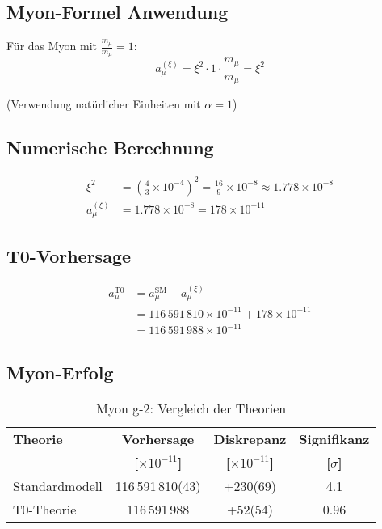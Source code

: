 \documentclass[12pt,a4paper]{article}
\newcommand{\xipar}{\xi}
\begin{document}
	\subsection{Myon-Formel Anwendung}
	
	Für das Myon mit \(\frac{m_\mu}{m_\mu} = 1\):
	\begin{equation}
		a_\mu^{(\xipar)} = \xipar^2 \cdot 1 \cdot \frac{m_\mu}{m_\mu} = \xipar^2
	\end{equation}
	
	(Verwendung natürlicher Einheiten mit \(\alpha = 1\))
	
	\subsection{Numerische Berechnung}
	
	\begin{align}
		\xipar^2 &= \left(\frac{4}{3} \times 10^{-4}\right)^2 = \frac{16}{9} \times 10^{-8} \approx 1.778 \times 10^{-8} \\
		a_\mu^{(\xipar)} &= 1.778 \times 10^{-8} = 178 \times 10^{-11}
	\end{align}
	
	\subsection{T0-Vorhersage}
	
	\begin{align}
		a_\mu^{\text{T0}} &= a_\mu^{\text{SM}} + a_\mu^{(\xipar)} \\
		&= 116\,591\,810 \times 10^{-11} + 178 \times 10^{-11} \\
		&= 116\,591\,988 \times 10^{-11}
	\end{align}
	
	\subsection{Myon-Erfolg}
	
	\begin{table}[H]
		\centering
		\caption{Myon g-2: Vergleich der Theorien}
		\begin{tabular}{@{}lccc@{}}
			\toprule
			\textbf{Theorie} & \textbf{Vorhersage} & \textbf{Diskrepanz} & \textbf{Signifikanz} \\
			& \textbf{[$\times 10^{-11}$]} & \textbf{[$\times 10^{-11}$]} & \textbf{[$\sigma$]} \\
			\midrule
			Standardmodell & 116\,591\,810(43) & +230(69) & 4.1 \\
			\rowcolor{green!20}
			T0-Theorie & 116\,591\,988 & +52(54) & 0.96 \\
			\bottomrule
		\end{tabular}
	\end{table}
	
\end{document}
